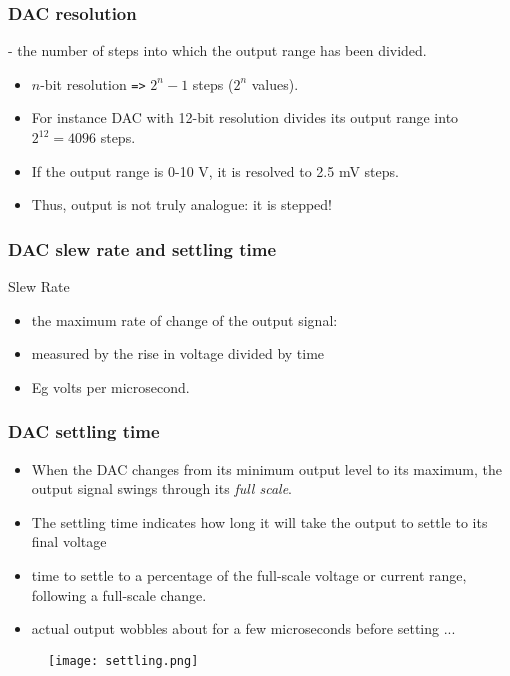 \documentclass[10pt]{beamer}
\begin{document}
\begin{frame}
\frametitle{DAC resolution}
- the number of steps into which the output range has been divided.
\begin{itemize}
\item $n$-bit resolution \texttt{=>} $2^n - 1$ steps ($2^n$ values).
\item For instance DAC with 12-bit resolution divides its output range into $2^{12} = 4096$ steps.
\item If the output range is 0-10 V, it is resolved to 2.5 mV steps.
\item Thus, output is not truly analogue: it is stepped!
\end{itemize}
\end{frame}

\begin{frame}
\frametitle{DAC slew rate and settling time}
Slew Rate
\begin{itemize}
\item the maximum rate of change of the output signal:
\item measured by the rise in voltage divided by time
\item Eg volts per microsecond.
\end{itemize}
\end{frame}

\begin{frame}
\frametitle{DAC settling time}
\begin{itemize}
\item When the DAC changes from its minimum output level to its maximum, the output signal swings through its \emph{full scale}.
\item The settling time indicates how long it will take the output to settle to
its final voltage
\item time to settle to a percentage of the full-scale voltage or current range, following a full-scale change.
\item actual output wobbles about for a few microseconds before setting ...
\end{itemize}

\begin{figure}[!htb]
\begin{center}
\texttt{[image: settling.png]}
\end{center}
\end{figure}
\end{frame}
\end{document}
